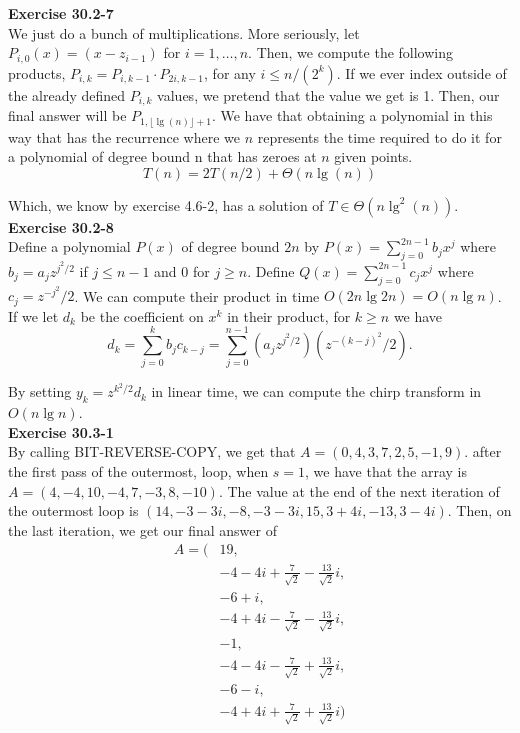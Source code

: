\documentclass{article}
\begin{document}
\noindent\textbf{Exercise 30.2-7}\\

We just do a bunch of multiplications. More seriously, let $P_{i,0}(x) = (x-z_{i-1})$ for $i=1,\ldots,n$. Then, we compute the following products, $P_{i,k} = P_{i,k-1} \cdot P_{2i,k-1}$, for any $i\le n/(2^k)$. If we ever index outside of the already defined $P_{i,k}$ values, we pretend that the value we get is 1. Then, our final answer will be $P_{1,\lfloor\lg(n)\rfloor+1}$. We have that obtaining a polynomial in this way that has the recurrence where we $n$ represents the time required to do it for a polynomial of degree bound n that has zeroes at $n$ given points.
\[
T(n) = 2T(n/2) + \Theta(n\lg(n))
\]

Which, we know by exercise 4.6-2, has a solution of $T\in \Theta(n\lg^2(n))$.\\

\noindent\textbf{Exercise 30.2-8}\\

Define a polynomial $P(x)$ of degree bound $2n$ by $P(x) = \sum_{j=0}^{2n-1} b_jx^j$ where $b_j = a_jz^{j^2/2}$ if $j \leq n-1$ and 0 for $j  \geq n$. Define $Q(x) = \sum_{j=0}^{2n-1} c_jx^j$ where $c_j = z^{-j^2}/2$.  We can compute their product in time $O(2n\lg 2n) = O(n \lg n)$. If we let $d_k$ be the coefficient on $x^k$ in their product, for $k \geq n$ we have  
\[d_k = \sum_{j=0}^k b_j c_{k-j} = \sum_{j=0}^{n-1}\left(a_jz^{j^2/2}\right)\left(z^{-(k-j)^2}/2\right).\]

By setting $y_k = z^{k^2/2}d_k$ in linear time, we can compute the chirp transform in $O(n \lg n)$. \\

\noindent\textbf{Exercise 30.3-1}\\

By calling BIT-REVERSE-COPY, we get that $A = (0,4,3,7,2,5,-1,9)$. after the first pass of the outermost, loop, when $s=1$, we have that the array is $A= (4,-4,10,-4,7,-3,8,-10)$. The value at the end of the next iteration of the outermost loop is $(14,-3-3i,-8,-3-3i,15,3+4i,-13,3-4i)$. Then, on the last iteration, we get our final answer of 
\begin{align*}
A = (&19,\\
&-4-4i+\frac{7}{\sqrt{2}} -\frac{13}{\sqrt{2}}i,\\
&-6+i,\\
&-4+4i-\frac{7}{\sqrt{2}} -\frac{13}{\sqrt{2}}i,\\
&-1,\\
&-4-4i-\frac{7}{\sqrt{2}} +\frac{13}{\sqrt{2}}i,\\
&-6-i,\\
&-4+4i+\frac{7}{\sqrt{2}} +\frac{13}{\sqrt{2}}i)
\end{align*}\\
\end{document}
